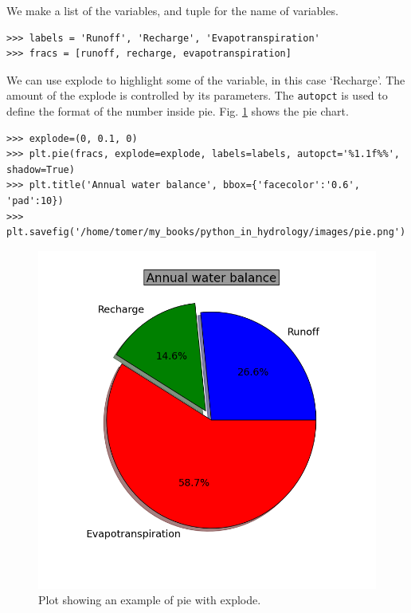 \documentclass[10pt]{book}
\begin{document}
We make a list of the variables, and tuple for the name of variables. 
\beforeverb \begin{verbatim}
>>> labels = 'Runoff', 'Recharge', 'Evapotranspiration'
>>> fracs = [runoff, recharge, evapotranspiration]
\end{verbatim} \afterverb

We can use explode to highlight some of the variable, in this case `Recharge'. The amount of the explode is controlled by its parameters. The \verb"autopct" is used to define the format of the number inside pie. Fig. \ref{fig:pie} shows the pie chart. 
\beforeverb \begin{verbatim}
>>> explode=(0, 0.1, 0)
>>> plt.pie(fracs, explode=explode, labels=labels, autopct='%1.1f%%', shadow=True)
>>> plt.title('Annual water balance', bbox={'facecolor':'0.6', 'pad':10})
>>> plt.savefig('/home/tomer/my_books/python_in_hydrology/images/pie.png')
\end{verbatim} \afterverb

\beforefig
\begin{figure}[h!]
  \centering
    \includegraphics[scale=0.5]{images/pie.png}
  \caption{Plot showing an example of pie with explode.}
   \label{fig:pie}
\end{figure}
\afterfig
\end{document}
